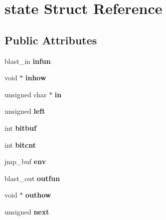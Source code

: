 \hypertarget{structstate}{}\section{state Struct Reference}
\label{structstate}
\subsection*{Public Attributes}
\begin{DoxyCompactItemize}
\item 
\mbox{\label{structstate_a9cefd1a78926f10a353274c995f61e88}} 
blast\+\_\+in {\bfseries infun}
\item 
\mbox{\label{structstate_a409ab94bc5623a4fb8456dd18884dbd3}} 
void $\ast$ {\bfseries inhow}
\item 
\mbox{\label{structstate_a73c2c76f7afee445661c82274e74aa66}} 
unsigned char $\ast$ {\bfseries in}
\item 
\mbox{\label{structstate_a1ac80f870aaec1964409bcb8c4a87d34}} 
unsigned {\bfseries left}
\item 
\mbox{\label{structstate_a582d99a570119648c33ef9c5acf00a0f}} 
int {\bfseries bitbuf}
\item 
\mbox{\label{structstate_ad1c5dbfc0c1c555bd5e30f830868e319}} 
int {\bfseries bitcnt}
\item 
\mbox{\label{structstate_a9a0d5bd9a472fbe06d3d811f5094da3c}} 
jmp\+\_\+buf {\bfseries env}
\item 
\mbox{\label{structstate_a440d2e2a4582c8392a7b0601b5d6fa7c}} 
blast\+\_\+out {\bfseries outfun}
\item 
\mbox{\label{structstate_a5ca414f90f070b0c009081ae64586eb1}} 
void $\ast$ {\bfseries outhow}
\item 
\mbox{\label{structstate_a28b7b290446097eacaf079dd73f07d6d}} 
unsigned {\bfseries next}
\item 
\mbox{\label{structstate_a9bf57de222a785e228911d1af0aff14a}} 

\end{DoxyCompactItemize}

